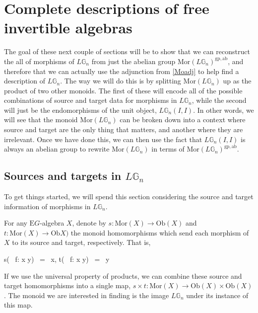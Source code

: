 \chapter{Complete descriptions of free invertible algebras}
\label{mainthm}

The goal of these next couple of sections will be to show that we can reconstruct the all of morphisms of $L\mathbb{G}_n$ from just the abelian group $\mathrm{Mor}(L\mathbb{G}_n)^{\mathrm{gp, ab}}$, and therefore that we can actually use the adjunction from \cref{Moadj} to help find a description of $L\mathbb{G}_n$. The way we will do this is by splitting $\mathrm{Mor}(L\mathbb{G}_n)$ up as the product of two other monoids. The first of these will encode all of the possible combinations of source and target data for morphisms in $L\mathbb{G}_n$, while the second will just be the endomorphisms of the unit object, $L\mathbb{G}_n(I, I)$. In other words, we will see that the monoid $\mathrm{Mor}(L\mathbb{G}_n)$ can be broken down into a context where source and target are the only thing that matters, and another where they are irrelevant. Once we have done this, we can then use the fact that $L\mathbb{G}_n(I, I)$ is always an abelian group to rewrite $\mathrm{Mor}(L\mathbb{G}_n)$ in terms of $\mathrm{Mor}(L\mathbb{G}_n)^{\mathrm{gp, ab}}$.

\section{Sources and targets in $L\mathbb{G}_n$}  

To get things started, we will spend this section considering the source and target information of morphisms in $L\mathbb{G}_n$. 

\begin{defn}\label{st} For any $\mathrm{E}G$-algebra $X$, denote by $s: \mathrm{Mor}(X) \to \mathrm{Ob}(X)$ and $t: \mathrm{Mor}(X) \to \mathrm{Ob}X)$ the monoid homomorphisms which send each morphism of $X$ to its source and target, respectively. That is,
\begin{eq*} s( \, f: x \to y) \, = \, x, \quad \quad t( \, f: x \to y) \, = \, y \end{eq*}
\end{defn}

If we use the universal property of products, we can combine these source and target homomorphisms into a single map, $s \times t: \mathrm{Mor}(X) \to \mathrm{Ob}(X) \times \mathrm{Ob}(X)$. The monoid we are interested in finding is the image $L\mathbb{G}_n$ under its instance of this map.

